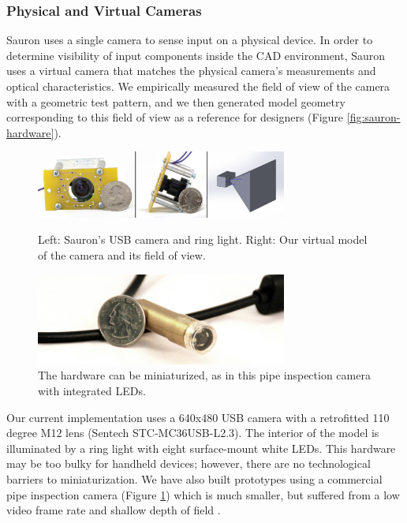 \subsubsection{Physical and Virtual Cameras}
Sauron uses a single camera to sense input on a physical device. In order to determine visibility of input components inside the CAD environment, Sauron uses a virtual camera that matches the physical camera's measurements and optical characteristics. We empirically measured the field of view of the camera with a geometric test pattern, and we then generated model geometry corresponding to this field of view as a reference for designers (Figure \ref{fig:sauron-hardware}).

\begin{figure}
\centering
\includegraphics[width=3.25in]{figures/sauron/camera-front-and-side.jpg}
\caption{Left: Sauron's USB camera and ring light.  Right: Our virtual model of the camera and its field of view.}
\label{fig:sauron-hardware}
\vspace{0.2in}
\includegraphics[width=3.25in]{figures/sauron/pipe-camera2.jpg}
\caption{The hardware can be miniaturized, as in this pipe inspection camera with integrated LEDs.}
\label{fig:sauron-inspectioncam}
\end{figure}

Our current implementation uses a 640x480 USB camera with a retrofitted 110 degree M12 lens (Sentech STC-MC36USB-L2.3). The interior of the model is illuminated by a ring light with eight surface-mount white LEDs. This hardware may be too bulky for handheld devices; however, there are no technological barriers to miniaturization. We have also built prototypes using a commercial pipe inspection camera (Figure \ref{fig:sauron-inspectioncam}) which is much smaller, but suffered from a low video frame rate and shallow depth of field .



